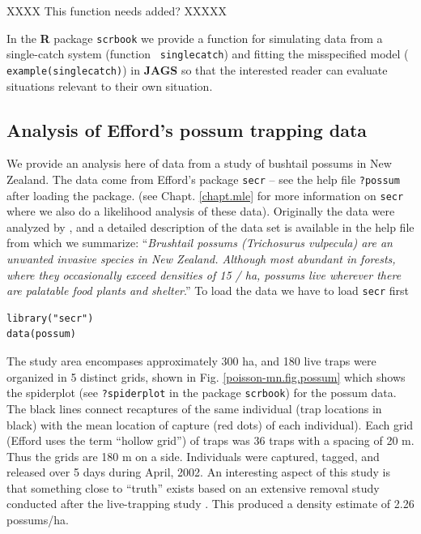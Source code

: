 XXXX This function needs added? XXXXX

In the {\bf R} package \mbox{\tt scrbook} we provide a function for
simulating data from a single-catch system (function \mbox{\tt
  singlecatch}) and fitting the misspecified model (\mbox{\tt
  example(singlecatch)}) in {\bf JAGS} so that the interested reader
can evaluate situations relevant to their own situation.

\subsection{Analysis of Efford's possum trapping data}


We provide an analysis here of data from a study of bushtail possums
in New Zealand. The data come from Efford's \R package \mbox{\tt secr}
-- see the help file \mbox{\tt ?possum} after loading the \secr package.
(see Chapt. \ref{chapt.mle} for more information on \mbox{\tt secr}
where we also do a likelihood analysis of these data).
Originally the data were analyzed by \citet{efford_etal:2005}, and 
a detailed description of the data set is available in the help file
from which we summarize:
``{\it Brushtail possums (Trichosurus vulpecula) are an unwanted invasive
species in New Zealand. Although most abundant in forests, where they
occasionally exceed densities of 15 / ha, possums live wherever there
are palatable food plants and shelter}.''
To load the data we have to load \mbox{\tt secr} first
\begin{verbatim}
library("secr")
data(possum)
\end{verbatim}
The study area encompases approximately 300 ha, and 180 live traps
were 
organized in 5 distinct grids, shown in  Fig. \ref{poisson-mn.fig.possum}
which shows the spiderplot (see \mbox{\tt ?spiderplot} in the \R
package \mbox{\tt scrbook}) for the possum data. The black lines
connect recaptures of the same individual (trap locations in black)
with the mean location of capture (red dots) of each individual).
Each grid (Efford uses
the term ``hollow grid'') of traps was
36 traps with a spacing of 20 m. Thus the grids are 180 m on a
side. 
Individuals were captured, tagged, and released over 5 days during
April, 2002. An interesting aspect of this study is that something
close to ``truth'' exists based on an extensive removal study
conducted after the live-trapping study \citep{Efford_etal:2005}. This
produced a density estimate of 2.26 possums/ha.

